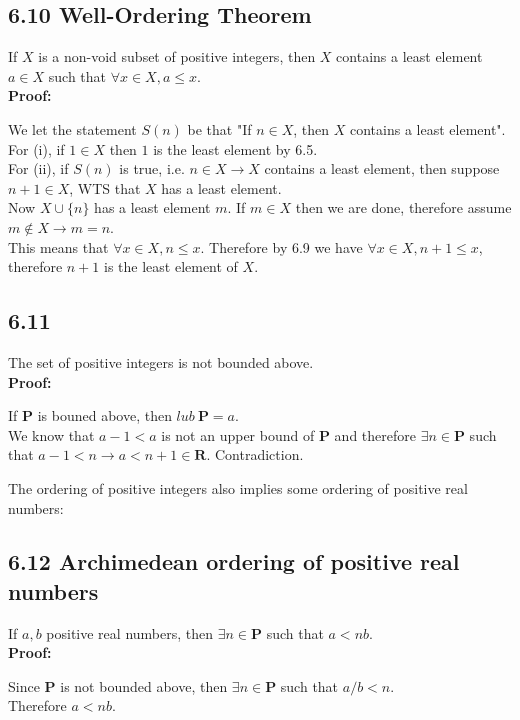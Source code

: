 \documentclass{article}
\begin{document}
\subsection*{6.10 Well-Ordering Theorem}
If $X$ is a non-void subset of positive integers, then $X$ contains a least element $a \in X$ such that $\forall x \in X, a \leq x$.\\
\textbf{Proof:}
\begin{addmargin}[1em]{0em}
     We let the statement $S(n)$ be that "If $n \in X$, then $X$ contains a least element".\\
     For (i), if $1 \in X$ then $1$ is the least element by 6.5.\\
     For (ii), if $S(n)$ is true, i.e. $n \in X \rightarrow X$ contains a least element, then suppose $n+1 \in X$, WTS that $X$ has a least element.\\
     Now $X \cup \{n\}$ has a least element $m$. If $m \in X$ then we are done, therefore assume $m \notin X \rightarrow m = n$.\\
     This means that $\forall x \in X, n \leq x$. Therefore by 6.9 we have $\forall x \in X, n+1 \leq x$, therefore $n+1$ is the least element of $X$.
\end{addmargin}
\subsection*{6.11}
The set of positive integers is not bounded above.\\
\textbf{Proof:}
\begin{addmargin}[1em]{0em}
    If $\mathbf{P}$ is bouned above, then $lub\ \mathbf{P} = a$.\\
    We know that $a - 1 < a$ is not an upper bound of $\mathbf{P}$ and therefore $\exists n \in \mathbf{P}$ such that $a - 1 < n \rightarrow a < n+1 \in \mathbf{R}$. Contradiction.
\end{addmargin}
The ordering of positive integers also implies some ordering of positive real numbers:
\subsection*{6.12 Archimedean ordering of positive real numbers}
If $a, b$ positive real numbers, then $\exists n \in \mathbf{P}$ such that $a < nb$.\\
\textbf{Proof:}
\begin{addmargin}[1em]{0em}
    Since $\mathbf{P}$ is not bounded above, then $\exists n \in \mathbf{P}$ such that $a/b < n$.\\
    Therefore $a < nb$.
\end{addmargin}
\end{document}
